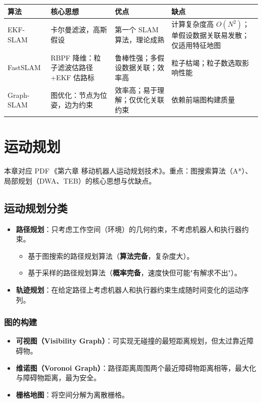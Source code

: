 \documentclass[11pt,a4paper]{article}
\begin{document}
\begin{center}
\begin{tabular}{p{2.5cm}|p{3.5cm}|p{3.5cm}|p{4cm}}
\toprule
算法 & 核心思想 & 优点 & 缺点 \\
\midrule
EKF-SLAM & 卡尔曼滤波，高斯假设 & 第一个 SLAM 算法，理论成熟 & 计算复杂度高 $O(N^2)$；单假设数据关联易发散；仅适用特征地图 \\
FastSLAM & RBPF 降维：粒子滤波估路径+EKF 估路标 & 鲁棒性强；多假设数据关联；效率高 & 粒子枯竭；粒子数选取影响性能 \\
Graph-SLAM & 图优化：节点为位姿，边为约束 & 效率高；易于理解；仅优化关联约束 & 依赖前端图构建质量 \\
\bottomrule
\end{tabular}
\end{center}

\section{运动规划}

\begin{keypoint}
本章对应 PDF\,《第六章 移动机器人运动规划技术》。重点：图搜索算法（A*）、局部规划（DWA、TEB）的核心思想与优缺点。
\end{keypoint}

\subsection{运动规划分类}
\begin{itemize}
  \item \textbf{路径规划}：只考虑工作空间（环境）的几何约束，不考虑机器人和执行器约束。
    \begin{itemize}
      \item 基于图搜索的路径规划算法（\textbf{算法完备}，复杂度大）。
      \item 基于采样的路径规划算法（\textbf{概率完备}，速度快但可能"有解求不出"）。
    \end{itemize}
  \item \textbf{轨迹规划}：在给定路径上考虑机器人和执行器约束生成随时间变化的运动序列。
\end{itemize}

\subsubsection*{图的构建}
\begin{itemize}
  \item \textbf{可视图（Visibility Graph）}：可实现无碰撞的最短距离规划，但太过靠近障碍物。
  \item \textbf{维诺图（Voronoi Graph）}：路径距离周围两个最近障碍物距离相等，最大化与障碍物距离，最为安全。
  \item \textbf{栅格地图}：将空间分解为离散栅格。
\end{itemize}
\end{document}
